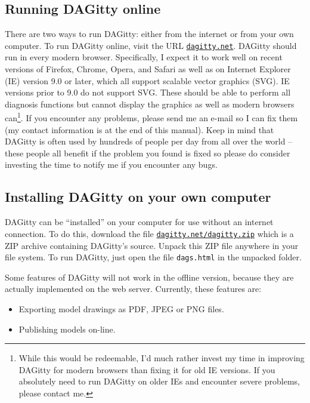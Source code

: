 \documentclass[a4paper,10pt]{article}
\newcommand{\pname}{{\sc DAG}itty\xspace}
\begin{document}
\subsection{Running \pname online}

There are two ways to run \pname: either from the internet or from your
own computer. To run \pname online, visit the URL
\href{http://www.dagitty.net}{\tt dagitty.net}.
\pname should run in every modern browser. Specifically, I expect it
to work well on recent versions of Firefox, Chrome, Opera, and Safari
as well as on Internet Explorer (IE) version 9.0 or later, which all
support scalable vector graphics (SVG). IE
versions prior to 9.0 do not support SVG. These should be able to perform
all diagnosis functions but cannot display the graphics as well as modern
browsers can\footnote{While this would be redeemable, I'd much rather invest my
time in improving \pname for modern browsers than fixing it for old IE versions.
If you absolutely need to run \pname on older IEs and encounter severe problems,
please contact me.}. If you encounter any problems, please send
me an e-mail so I can fix them (my contact information is at the end of this manual). 
Keep in mind that \pname is often used by hundreds of people per day
from all over the world -- these people all benefit if the problem you found is 
fixed so please do consider investing
the time to notify me if you encounter any bugs.

\subsection{Installing \pname on your own computer} 

\pname can be ``installed'' on your computer for use without an internet
connection. To do this, download the file 
\href{http://www.dagitty.net/dagitty.zip}{\tt dagitty.net/dagitty.zip}
which is a ZIP archive containing \pname's source. Unpack this ZIP file anywhere
in your file system. To run \pname, just open the file \verb|dags.html| in the
unpacked folder. 

Some features of \pname will not work in the offline version, because they
are actually implemented on the web server. Currently, these features are:
\begin{itemize}
\item Exporting model drawings as PDF, JPEG or PNG files.
\item Publishing models on-line.
\end{itemize}
\end{document}
